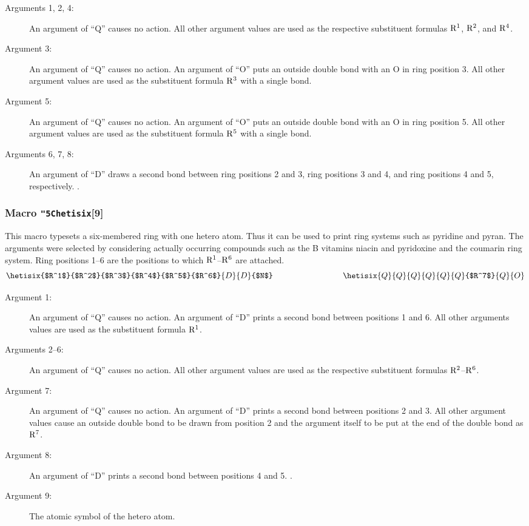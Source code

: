  \reinit
 \begin{description}
 \item[{\rm Arguments 1, 2, 4:}] An argument of ``Q''
      causes no action. All other argument values are used as
      the respective substituent formulas ${\rm R^1}$, ${\rm R^2}$,
      and ${\rm R^4}$.
 \item[{\rm Argument 3:}] An argument of ``Q'' causes
      no action. An argument of ``O'' puts an outside double
      bond with an O in ring position 3. All other argument
      values are used as the substituent formula ${\rm R^3}$
      with a single bond.
 \item[{\rm Argument 5:}] An argument of ``Q'' causes
      no action. An argument of ``O'' puts an outside double
      bond with an O in ring position 5. All other argument
      values are used as the substituent formula ${\rm R^5}$
      with a single bond.
 \item[{\rm Arguments 6, 7, 8:}] An argument of ``D''
      draws a second bond between ring positions 2 and 3,
      ring positions 3 and 4, and ring positions 4 and 5,
      respectively. \rii .
 \end{description}
 
\subsubsection{Macro {\tt\char"5C{}hetisix}[9]}
 This macro typesets a six-membered ring with one hetero
 atom. Thus it can be used to print ring systems such as
 pyridine and pyran. The arguments were selected by
 considering actually occurring compounds such as the
 B vitamins niacin and pyridoxine and the coumarin ring
 system. Ring positions 1--6 are the positions to which
 ${\rm R^1}$--${\rm R^6}$ are attached.
 \[ \hetisix{$R^1$}{$R^2$}{$R^3$}{$R^4$}{$R^5$}{$R^6$}
            {D}{D}{$N$}
    \hspace{3cm}
    \hetisix{Q}{Q}{Q}{Q}{Q}{Q}{$R^7$}{Q}{O}    \]
 
 \begin{description}
 \item[{\rm Argument 1:}] An argument of ``Q'' causes
      no action. An argument of ``D'' prints a second bond
      between positions 1 and 6. All other arguments values
      are used as the substituent formula ${\rm R^1}$.
 \item[{\rm Arguments 2--6:}] An argument of ``Q''
      causes no action. All other argument values are used as
      the respective substituent formulas ${\rm R^2}$--${\rm R^6}$.
 \item[{\rm Argument 7:}] An argument of ``Q'' causes
      no action. An argument of ``D'' prints a second bond
      between positions 2 and 3. All other argument values
      cause an outside double bond to be drawn from position
      2 and the argument itself to be put at the end of the
      double bond as ${\rm R^7}$.
 \item[{\rm Argument 8:}] An argument of ``D'' prints
      a second bond between positions 4 and 5. \rii .
 \item[{\rm Argument 9:}] The atomic symbol of the
      hetero atom.
 \end{description}
 
